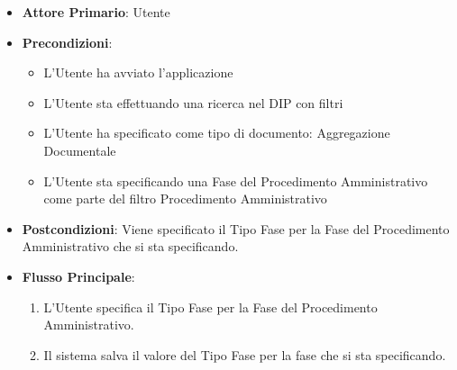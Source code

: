\begin{itemize}
      \item \textbf{Attore Primario}: Utente
      \item \textbf{Precondizioni}: 
      \begin{itemize}
            \item L'Utente ha avviato l'applicazione
            \item L'Utente sta effettuando una ricerca nel DIP con filtri
            \item L'Utente ha specificato come tipo di documento: Aggregazione Documentale
            \item L'Utente sta specificando una Fase del Procedimento Amministrativo come parte del filtro Procedimento Amministrativo
      \end{itemize}
      \item \textbf{Postcondizioni}: Viene specificato il Tipo Fase per la Fase del Procedimento Amministrativo che si sta specificando.
      \item \textbf{Flusso Principale}:
      \begin{enumerate}
            \item L'Utente specifica il Tipo Fase per la Fase del Procedimento Amministrativo.
            \item Il sistema salva il valore del Tipo Fase per la fase che si sta specificando.
      \end{enumerate}
\end{itemize}

